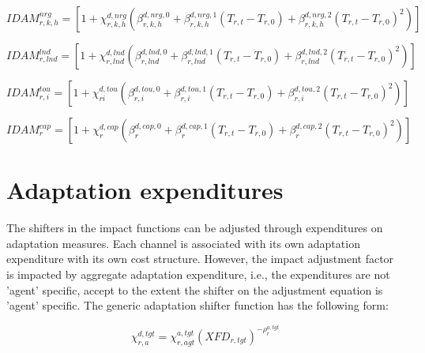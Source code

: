 \documentclass[11pt,letterpaper]{report}
\begin{document}
\begin{equation}
\label{eq:dam_nrg}
\mathit{IDAM}^{\mathit{nrg}}_{r,k,h} =
\left[1 + \chi^{d,\mathit{nrg}}_{r,k,h}
\left(
\beta^{d,\mathit{nrg},0}_{r,k,h} +  \beta^{d,\mathit{nrg},1}_{r,k,h}
\left(T_{r,t} - T_{r,0}\right) +
\beta^{d,\mathit{nrg},2}_{r,k,h}
\left(T_{r,t} - T_{r,0}\right)^2
\right)
\right]
\end{equation}

\begin{equation}
\label{eq:dam_lnd}
\mathit{IDAM}^{\mathit{lnd}}_{r,\mathit{lnd}} =
\left[1 + \chi^{d,\mathit{lnd}}_{r,\mathit{lnd}}
\left(
\beta^{d,\mathit{lnd},0}_{r,\mathit{lnd}} +  \beta^{d,\mathit{lnd},1}_{r,\mathit{lnd}}
\left(T_{r,t} - T_{r,0}\right) +
\beta^{d,\mathit{lnd},2}_{r,\mathit{lnd}}
\left(T_{r,t} - T_{r,0}\right)^2
\right)
\right]
\end{equation}

\begin{equation}
\label{eq:dam_tou}
\mathit{IDAM}^{\mathit{tou}}_{r,i} =
\left[1 + \chi^{d,\mathit{tou}}_{ri}
\left(
\beta^{d,\mathit{tou},0}_{r,i} +  \beta^{d,\mathit{tou},1}_{r,i}
\left(T_{r,t} - T_{r,0}\right) +
\beta^{d,\mathit{tou},2}_{r,i}
\left(T_{r,t} - T_{r,0}\right)^2
\right)
\right]
\end{equation}

\begin{equation}
\label{eq:dam_cap}
\mathit{IDAM}^{\mathit{cap}}_{r} =
\left[1 + \chi^{d,\mathit{cap}}_{r}
\left(
\beta^{d,\mathit{cap},0}_{r} +  \beta^{d,\mathit{cap},1}_{r}
\left(T_{r,t} - T_{r,0}\right) +
\beta^{d,\mathit{cap},2}_{r}
\left(T_{r,t} - T_{r,0}\right)^2
\right)
\right]
\end{equation}

\section{Adaptation expenditures}

The shifters in the impact functions can be adjusted through
expenditures on adaptation measures. Each channel is associated
with its own adaptation expenditure with its own cost structure. However,
the impact adjustment factor is impacted by aggregate adaptation
expenditure, i.e., the expenditures are not
'agent' specific, accept to the extent the shifter
on the adjustment equation is 'agent' specific. The generic adaptation
shifter function has the following form:

\[
\chi^{d,\mathit{tgt}}_{r,a}
= \chi^{a,\mathit{tgt}}_{r,\mathit{agt}} \left(
\mathit{XFD}_{r,\mathit{tgt}}
\right)^{-\rho^{a,\mathit{tgt}}_{r}}
\]
\end{document}
